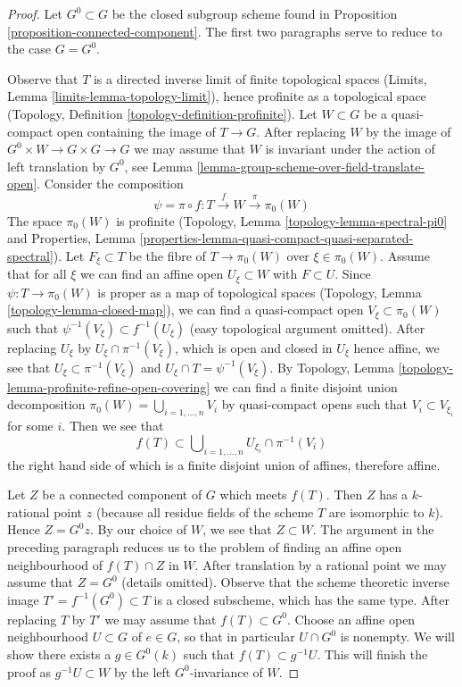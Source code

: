\begin{proof}
Let $G^0 \subset G$ be the closed subgroup scheme found in
Proposition \ref{proposition-connected-component}. The first two paragraphs
serve to reduce to the case $G = G^0$.

\medskip\noindent
Observe that $T$ is a directed inverse limit of finite topological spaces
(Limits, Lemma \ref{limits-lemma-topology-limit}), hence profinite as a
topological space (Topology, Definition \ref{topology-definition-profinite}).
Let $W \subset G$ be a quasi-compact open containing the image of $T \to G$.
After replacing $W$ by the image of $G^0 \times W \to G \times G \to G$ we may
assume that $W$ is invariant under the action of left translation by $G^0$, see
Lemma \ref{lemma-group-scheme-over-field-translate-open}.
Consider the composition
$$
\psi = \pi \circ f : T \xrightarrow{f} W \xrightarrow{\pi} \pi_0(W)
$$
The space $\pi_0(W)$ is profinite
(Topology, Lemma \ref{topology-lemma-spectral-pi0} and
Properties, Lemma
\ref{properties-lemma-quasi-compact-quasi-separated-spectral}).
Let $F_\xi \subset T$ be the fibre of $T \to \pi_0(W)$ over $\xi \in \pi_0(W)$.
Assume that for all $\xi$ we can find an affine open $U_\xi \subset W$ with
$F \subset U$. Since $\psi : T \to \pi_0(W)$ is proper as a map of
topological spaces (Topology, Lemma \ref{topology-lemma-closed-map}),
we can find a quasi-compact open $V_\xi \subset \pi_0(W)$ such that
$\psi^{-1}(V_\xi) \subset f^{-1}(U_\xi)$ (easy topological argument omitted).
After replacing $U_\xi$ by $U_\xi \cap \pi^{-1}(V_\xi)$, which is open and
closed in $U_\xi$ hence affine, we see that $U_\xi \subset \pi^{-1}(V_\xi)$
and $U_\xi \cap T = \psi^{-1}(V_\xi)$.
By Topology, Lemma \ref{topology-lemma-profinite-refine-open-covering}
we can find a finite disjoint union decomposition
$\pi_0(W) = \bigcup_{i = 1, \ldots, n} V_i$ by quasi-compact opens such that
$V_i \subset V_{\xi_i}$ for some $i$. Then we see that
$$
f(T) \subset \bigcup\nolimits_{i = 1, \ldots, n} U_{\xi_i} \cap \pi^{-1}(V_i)
$$
the right hand side of which is a finite disjoint union of affines, therefore
affine.

\medskip\noindent
Let $Z$ be a connected component of $G$ which meets $f(T)$. Then $Z$
has a $k$-rational point $z$ (because all residue fields of the scheme $T$
are isomorphic to $k$). Hence $Z = G^0 z$. By our choice of $W$, we see
that $Z \subset W$. The argument in the preceding paragraph reduces us to
the problem of finding an affine open neighbourhood of $f(T) \cap Z$ in $W$.
After translation by a rational point we may assume that $Z = G^0$
(details omitted). Observe that the scheme theoretic inverse image
$T' = f^{-1}(G^0) \subset T$ is a closed subscheme, which has the same type.
After replacing $T$ by $T'$ we may assume that $f(T) \subset G^0$.
Choose an affine open neighbourhood $U \subset G$
of $e \in G$, so that in particular $U \cap G^0$ is nonempty. We will show
there exists a $g \in G^0(k)$ such that $f(T) \subset g^{-1}U$.
This will finish the proof as $g^{-1}U \subset W$ by the left
$G^0$-invariance of $W$.


\end{proof}
